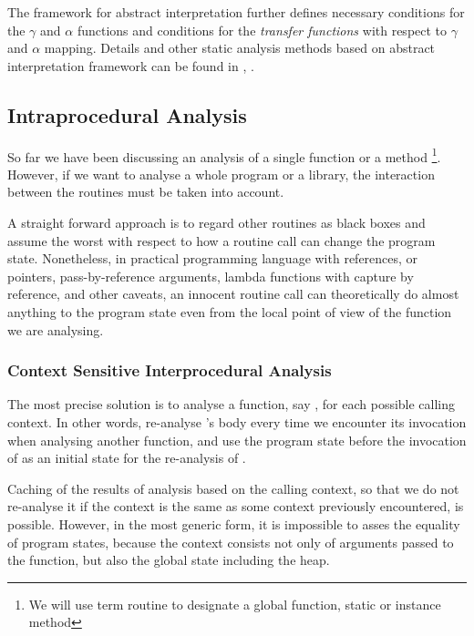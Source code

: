        The framework for abstract interpretation further defines 
        necessary conditions for the $\gamma$ and $\alpha$ functions 
        and conditions for the \emph{transfer functions} with respect 
        to $\gamma$ and $\alpha$ mapping. Details and other 
        static analysis methods based on abstract interpretation 
        framework can be found in \cite{cousot1977abstract}, 
        \cite{Cousot2000abstract}.

        \subsection{Intraprocedural Analysis}
        
        So far we have been discussing an analysis of a single function 
        or a method \footnote{We will use term 
        routine to designate a global function, static or instance method}. 
        However, if we want to analyse a whole program or 
        a library, the interaction between the routines 
        must be taken into account.
        
        A straight forward approach is to regard other routines as 
        black boxes and assume the worst with respect to how a 
        routine call can change the program state. Nonetheless, 
        in practical programming language with references, or pointers,  
        pass-by-reference arguments, lambda functions with 
        capture by reference, and other caveats, an innocent 
        routine call can theoretically do almost anything to 
        the program state even from the local point of view 
        of the function we are analysing.
                
        \subsubsection*{Context Sensitive Interprocedural Analysis}
        
        The most precise solution is to analyse a function, 
        say , for each possible calling context. 
        In other words, re-analyse 's body every 
        time we encounter its invocation when analysing another 
        function, and use the program state before 
        the invocation of  as an initial state 
        for the re-analysis of .
        
        Caching of the results of analysis based on 
        the calling context, so that we do not re-analyse it 
        if the context is the same as some context previously 
        encountered, is possible. However, in the most generic 
        form, it is impossible to asses the equality of 
        program states, because the context consists not only 
        of arguments passed to the function, but also the 
        global state including the heap.
        
